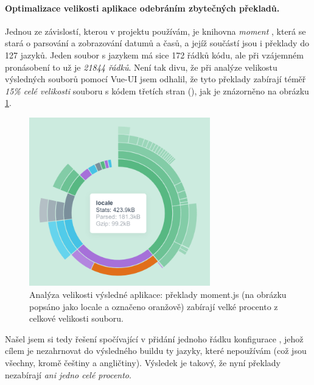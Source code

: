 \paragraph{Optimalizace velikosti aplikace odebráním zbytečných překladů.} Jednou ze závislostí, kterou v projektu používám, je knihovna \emph{moment} \cite{momentjs}, která se stará o parsování a zobrazování datumů a časů, a jejíž součástí jsou i překlady do 127 jazyků. Jeden soubor s jazykem má sice  172 řádků kódu, ale při vzájemném pronásobení to už je \emph{21844 řádků}. Není tak divu, že při analýze velikostu výsledných souborů pomocí Vue-UI jsem odhalil, že tyto překlady zabírají téměř \emph{15\% celé velikosti} souboru s kódem třetích stran (), jak je znázorněno na obrázku \ref{picture:cli:analyze}.

\begin{figure}[]
\includegraphics[width=0.7\textwidth]{../png/cli/analyze-moment.png}
\caption[Analýza velikosti výsledné aplikace: překlady moment.js]{Analýza velikosti výsledné aplikace: překlady moment.js (na obrázku popsáno jako locale a označeno oranžově) zabírají velké procento z celkové velikosti souboru.} \label{picture:cli:analyze}
\end{figure}

Našel jsem si tedy řešení spočívající v přidání jednoho řádku konfigurace \cite{momentjs-ignore-locale}, jehož cílem je nezahrnovat do výsledného buildu ty jazyky, které nepoužívám (což jsou všechny, kromě češtiny a angličtiny). Výsledek je takový, že nyní překlady nezabírají \emph{ani jedno celé procento}.


